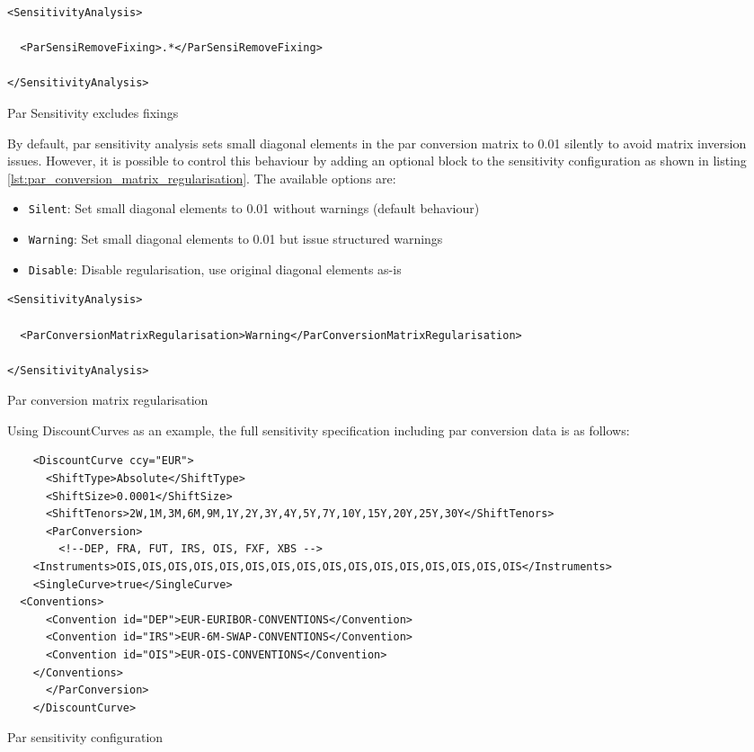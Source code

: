 \begin{longlisting}
  \begin{verbatim}
<SensitivityAnalysis>

  <ParSensiRemoveFixing>.*</ParSensiRemoveFixing>

</SensitivityAnalysis>
\end{verbatim}
\caption{Par Sensitivity excludes fixings}
\label{lst:par_sensi_excludes_fixings}
\end{longlisting}

By default, par sensitivity analysis sets small diagonal elements in the par conversion matrix to 0.01 silently to avoid matrix inversion issues. However, it is possible to control this behaviour by adding an optional block to the sensitivity configuration as shown in listing \ref{lst:par_conversion_matrix_regularisation}. The available options are:

\begin{itemize}
\item {\tt Silent}: Set small diagonal elements to 0.01 without warnings (default behaviour)
\item {\tt Warning}: Set small diagonal elements to 0.01 but issue structured warnings
\item {\tt Disable}: Disable regularisation, use original diagonal elements as-is
\end{itemize}

\begin{longlisting}
  \begin{verbatim}
<SensitivityAnalysis>

  <ParConversionMatrixRegularisation>Warning</ParConversionMatrixRegularisation>

</SensitivityAnalysis>
\end{verbatim}
\caption{Par conversion matrix regularisation}
\label{lst:par_conversion_matrix_regularisation}
\end{longlisting}

Using DiscountCurves as an example, the full sensitivity specification including par conversion data is as follows:

\begin{longlisting}
  \begin{verbatim}
    <DiscountCurve ccy="EUR">
      <ShiftType>Absolute</ShiftType>
      <ShiftSize>0.0001</ShiftSize>
      <ShiftTenors>2W,1M,3M,6M,9M,1Y,2Y,3Y,4Y,5Y,7Y,10Y,15Y,20Y,25Y,30Y</ShiftTenors>
      <ParConversion>
        <!--DEP, FRA, FUT, IRS, OIS, FXF, XBS -->
	<Instruments>OIS,OIS,OIS,OIS,OIS,OIS,OIS,OIS,OIS,OIS,OIS,OIS,OIS,OIS,OIS,OIS</Instruments>
	<SingleCurve>true</SingleCurve>
  <Conventions>
	  <Convention id="DEP">EUR-EURIBOR-CONVENTIONS</Convention>
	  <Convention id="IRS">EUR-6M-SWAP-CONVENTIONS</Convention>
	  <Convention id="OIS">EUR-OIS-CONVENTIONS</Convention>
	</Conventions>
      </ParConversion>
    </DiscountCurve>
\end{verbatim}
\caption{Par sensitivity configuration}
\label{lst:par_sensitivity_config}
\end{longlisting}

